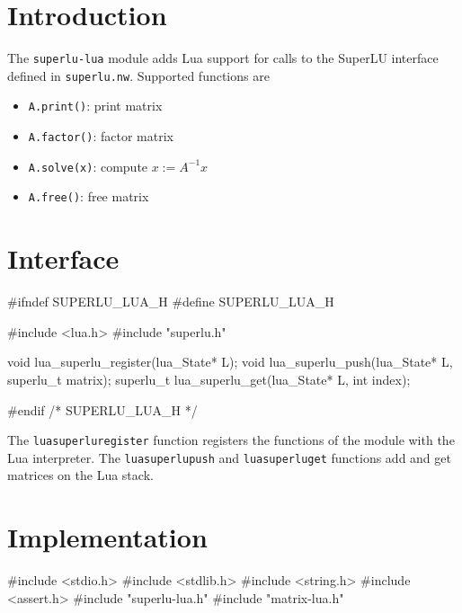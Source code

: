 
\section{Introduction}

The {\tt{}superlu-lua} module adds Lua support for calls to the SuperLU
interface defined in {\tt{}superlu.nw}.  Supported functions are
\begin{itemize}
  \item {\tt{}A.print()}:   print matrix
  \item {\tt{}A.factor()}:  factor matrix
  \item {\tt{}A.solve(x)}:  compute $x := A^{-1}x$
  \item {\tt{}A.free()}:    free matrix
\end{itemize}


\section{Interface}

\endmoddef
#ifndef SUPERLU_LUA_H
#define SUPERLU_LUA_H 

#include <lua.h>
#include "superlu.h"

void      lua_superlu_register(lua_State* L);
void      lua_superlu_push(lua_State* L, superlu_t matrix);
superlu_t lua_superlu_get(lua_State* L, int index);

#endif /* SUPERLU_LUA_H */
\nwendcode{}\nwdocspar

The {\tt{}lua{}superlu{}register} function registers the functions of
the module with the Lua interpreter.  The {\tt{}lua{}superlu{}push}
and {\tt{}lua{}superlu{}get} functions add and get matrices
on the Lua stack.


\section{Implementation}

\nwenddocs{}\endmoddef
#include <stdio.h>
#include <stdlib.h>
#include <string.h>
#include <assert.h>
#include "superlu-lua.h"
#include "matrix-lua.h"

